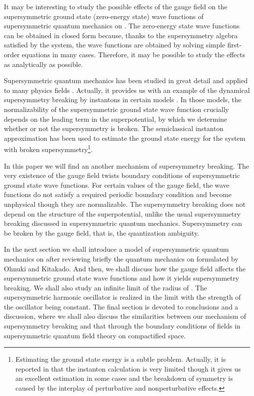 \documentclass[a4paper,12pt]{article}
\begin{document}
It may be interesting to study the possible 
effects of the gauge field on the supersymmetric 
ground state (zero-energy state) wave 
functions of supersymmetric quantum mechanics on \coordHE{}. 
The zero-energy state wave functions can be obtained in closed form 
\cite{claud} because, thanks to the 
supersymmetry algebra satisfied by the system, the wave functions are  
obtained by solving simple first-order equations in many cases. 
Therefore, it may be possible to study 
the effects as analytically as possible.   
\par
Supersymmetric quantum mechanics has been studied in great 
detail and applied to many physics fields \cite{cooper}. Actually, it 
provides us with an example of the dynamical supersymmetry 
breaking by instantons
in certain models \cite{witten}\cite{holton}\cite{freedman}\cite{khare}.  
In those models, the normalizability of the supersymmetric ground state 
wave function crucially depends on the leading term in the 
superpotential, by which we determine whether or not 
the supersymmetry is broken. The semiclassical 
instanton approximation has been used to estimate
the ground state energy for the system with broken 
supersymmetry\footnote{Estimating the ground state energy is a subtle problem.
Actually, it is reported in \cite{abbott1}\cite{abbott2} that the instanton 
calculation is very limited though it gives us an excellent estimation 
in some cases and the 
breakdown of symmetry is caused by the interplay of perturbative 
and nonperturbative effects.}.
\par
In this paper we will find an another mechanism 
of supersymmetry breaking. The very existence of the gauge field twists
boundary conditions of supersymmetric ground state wave functions.
For certain values of the gauge field, the wave functions do not satisfy
a required periodic boundary condition and become
unphysical though they are normalizable. 
The supersymmetry breaking does not depend on the 
structure of the superpotential, unlike the usual
supersymmetry breaking discussed in supersymmetric quantum mechanics. 
Supersymmetry can be broken by the
gauge field, that is, the quantization ambiguity. 
\par
In the next section we shall introduce a model of supersymmetric 
quantum mechanics on \coordHE{} after reviewing briefly the 
quantum mechanics on \coordHE{}
formulated by Ohnuki and Kitakado.  And then, we shall 
discuss how the gauge field affects the supersymmetric ground state wave 
functions and how it yields supersymmetry breaking. 
We shall also study an infinite limit of the radius of \coordHE{}. 
The supersymmetric
harmonic oscillator is realized in the limit with the 
strength of the oscillator being constant. 
The final section is devoted to conclusions and a discussion, where 
we shall also discuss the similarities between our mechanism of  
supersymmetry breaking and that through the boundary conditions 
of fields in supersymmetric quantum field theory on compactified 
space.
\end{document}
